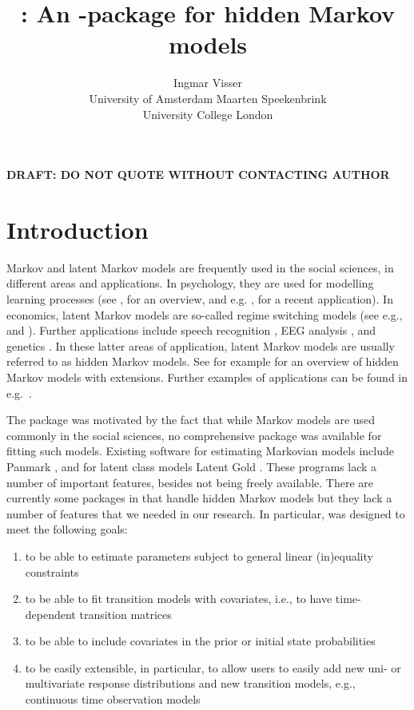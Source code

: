 \documentclass[article]{jss}
\author{Ingmar Visser\\University of Amsterdam \And 
        Maarten Speekenbrink\\University College London}
\title{\pkg{depmixS4} : An \proglang{R}-package for hidden Markov models}
\begin{document}


\begin{center}
\bf{DRAFT: DO NOT QUOTE WITHOUT CONTACTING AUTHOR}
\end{center}

\section{Introduction}

Markov and latent Markov models are frequently used in the social
sciences, in different areas and applications.  In psychology, they
are used for modelling learning processes (see \citealp{Wickens1982},
for an overview, and e.g. \citealp{Schmittmann2006}, for a recent
application).  In economics, latent Markov models are so-called regime
switching models (see e.g., \citealp{Kim1994} and
\citealp{Ghysels1994}).  Further applications include speech
recognition \citep{Rabiner1989}, EEG analysis \citep{Rainer2000}, and
genetics \citep{Krogh1998}.  In these latter areas of application,
latent Markov models are usually referred to as hidden Markov models.
See for example \citet{Fruhwirth2006} for an overview of hidden Markov
models with extensions.  Further examples of applications can be found
in e.g.\ \citet[][chapter~1]{Cappe2005}.

The  package was motivated by the fact that while Markov
models are used commonly in the social sciences, no comprehensive
package was available for fitting such models.  Existing software for
estimating Markovian models include Panmark \citep{Pol1996}, and for
latent class models Latent Gold \citep{Vermunt2003}.  These programs
lack a number of important features, besides not being freely
available.  There are currently some packages in  that
handle hidden Markov models but they lack a number of features that we
needed in our research.  In particular,  was designed to
meet the following goals:

\begin{enumerate}
	
	\item to be able to estimate parameters subject to general
	linear (in)equality constraints
	
	\item to be able to fit transition models with covariates, i.e.,
	to have time-dependent transition matrices
	
	\item to be able to include covariates in the prior or initial
	state probabilities
	
	\item to be easily extensible, in particular, to allow users to
	easily add new uni- or multivariate response distributions and
	new transition models, e.g., continuous time observation models
	
\end{enumerate}
\end{document}
